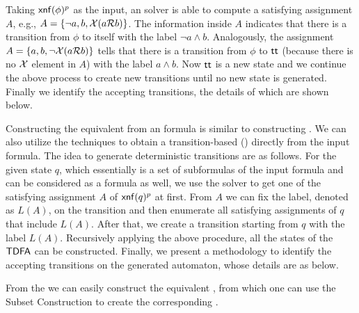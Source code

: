 Taking $\xnf(\phi)^p$ as the input, an \SAT solver is able to compute a satisfying assignment $A$, e.g., $A=\{\neg a, b, \X(a\R b)\}$. The information inside $A$ indicates that there is a transition from $\phi$ to itself with the label $\neg a\wedge b$. Analogously, the assignment $A=\{a, b, \neg \X(a\R b)\}$ tells that there is a transition from $\phi$ to $\tt$ (because there is no $\X$ element in $A$) with the label $a\wedge b$. Now $\tt$ is a new state and we continue the above process to create new transitions until no new state is generated. Finally we identify the accepting transitions, the details of which are shown below. 

Constructing the equivalent \DFA from an \ltlf formula is similar to constructing \NFA. We can also utilize the \SAT techniques to obtain a transition-based \DFA (\TDFA) directly from the input formula. The idea to generate deterministic transitions are as follows. For the given state $q$, which essentially is a set of subformulas of the input formula and can be considered as a formula as well, we use the \SAT solver to get one of the satisfying assignment $A$ of $\xnf(q)^p$ at first. From $A$ we can fix the label, denoted as $L(A)$, on the transition and then enumerate all satisfying assignments of $q$ that include $L(A)$. After that, we create a transition starting from $q$ with the label $L(A)$. Recursively applying the above procedure, all the states of the $\TDFA$ can be constructed. Finally, we present a methodology to identify the accepting transitions on the generated automaton, whose details are as below. 

From the \TDFA we can easily construct the equivalent \NFA, from which one can use the Subset Construction to create the corresponding \DFA.




